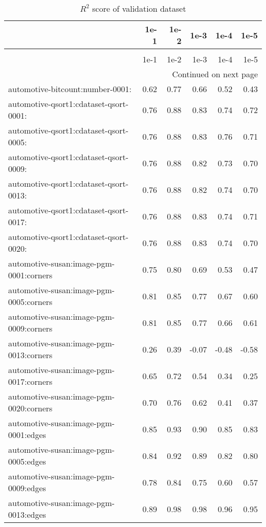 \begin{longtable}{lrrrrr}
\caption{$R^2$ score of validation dataset} \label{table:validate_score} \\
\toprule
 & 1e-1 & 1e-2 & 1e-3 & 1e-4 & 1e-5 \\
\midrule
\endfirsthead
\caption[]{$R^2$ score of validation dataset} \\
\toprule
 & 1e-1 & 1e-2 & 1e-3 & 1e-4 & 1e-5 \\
\midrule
\endhead
\midrule
\multicolumn{6}{r}{Continued on next page} \\
\midrule
\endfoot
\bottomrule
\endlastfoot
automotive-bitcount:number-0001: & 0.62 & 0.77 & 0.66 & 0.52 & 0.43 \\
automotive-qsort1:cdataset-qsort-0001: & 0.76 & 0.88 & 0.83 & 0.74 & 0.72 \\
automotive-qsort1:cdataset-qsort-0005: & 0.76 & 0.88 & 0.83 & 0.76 & 0.71 \\
automotive-qsort1:cdataset-qsort-0009: & 0.76 & 0.88 & 0.82 & 0.73 & 0.70 \\
automotive-qsort1:cdataset-qsort-0013: & 0.76 & 0.88 & 0.82 & 0.74 & 0.70 \\
automotive-qsort1:cdataset-qsort-0017: & 0.76 & 0.88 & 0.83 & 0.74 & 0.71 \\
automotive-qsort1:cdataset-qsort-0020: & 0.76 & 0.88 & 0.83 & 0.74 & 0.70 \\
automotive-susan:image-pgm-0001:corners & 0.75 & 0.80 & 0.69 & 0.53 & 0.47 \\
automotive-susan:image-pgm-0005:corners & 0.81 & 0.85 & 0.77 & 0.67 & 0.60 \\
automotive-susan:image-pgm-0009:corners & 0.81 & 0.85 & 0.77 & 0.66 & 0.61 \\
automotive-susan:image-pgm-0013:corners & 0.26 & 0.39 & -0.07 & -0.48 & -0.58 \\
automotive-susan:image-pgm-0017:corners & 0.65 & 0.72 & 0.54 & 0.34 & 0.25 \\
automotive-susan:image-pgm-0020:corners & 0.70 & 0.76 & 0.62 & 0.41 & 0.37 \\
automotive-susan:image-pgm-0001:edges & 0.85 & 0.93 & 0.90 & 0.85 & 0.83 \\
automotive-susan:image-pgm-0005:edges & 0.84 & 0.92 & 0.89 & 0.82 & 0.80 \\
automotive-susan:image-pgm-0009:edges & 0.78 & 0.84 & 0.75 & 0.60 & 0.57 \\
automotive-susan:image-pgm-0013:edges & 0.89 & 0.98 & 0.98 & 0.96 & 0.95 \\

\end{longtable}
